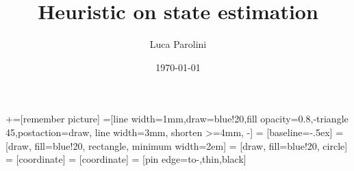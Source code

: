 \documentclass[aspectratio=169, fleqn, 10pt]{beamer}
\title{Heuristic on state estimation}
\author{Luca Parolini}
\date{\today}
\begin{document}
	
+=[remember picture]
=[line width=1mm,draw=blue!20,fill opacity=0.8,-triangle 45,postaction={draw, line width=3mm, shorten >=4mm, -}]
 = [baseline=-.5ex]
 = [draw, fill=blue!20, rectangle, minimum width=2em] %
 = [draw, fill=blue!20, circle] %
 = [coordinate]
 = [coordinate]
 = [pin edge={to-,thin,black}]


\maketitle

\end{document}
